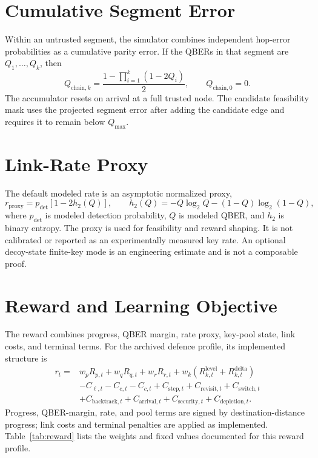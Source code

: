 \documentclass[12pt,a4paper,oneside]{report}
\begin{document}
\section{Cumulative Segment Error}
Within an untrusted segment, the simulator combines independent hop-error probabilities as a cumulative parity error. If the QBERs in that segment are $Q_1,\ldots,Q_k$, then
\begin{equation}
Q_{\mathrm{chain},k}
=\frac{1-\prod_{i=1}^{k}(1-2Q_i)}{2},
\qquad Q_{\mathrm{chain},0}=0.
\label{eq:chain}
\end{equation}
The accumulator resets on arrival at a full trusted node. The candidate feasibility mask uses the projected segment error after adding the candidate edge and requires it to remain below $Q_{\max}$.

\section{Link-Rate Proxy}
The default modeled rate is an asymptotic normalized proxy,
\begin{equation}
r_{\mathrm{proxy}}=p_{\mathrm{det}}\left[1-2h_2(Q)\right],
\qquad h_2(Q)=-Q\log_2Q-(1-Q)\log_2(1-Q),
\label{eq:proxy}
\end{equation}
where $p_{\mathrm{det}}$ is modeled detection probability, $Q$ is modeled QBER, and $h_2$ is binary entropy. The proxy is used for feasibility and reward shaping. It is not calibrated or reported as an experimentally measured key rate. An optional decoy-state finite-key mode is an engineering estimate and is not a composable proof.

\section{Reward and Learning Objective}
The reward combines progress, QBER margin, rate proxy, key-pool state, link costs, and terminal terms. For the archived defence profile, its implemented structure is
\begin{align}
r_t={}&w_pR_{p,t}+w_qR_{q,t}+w_rR_{r,t}
+w_k\left(R_{k,t}^{\mathrm{level}}+R_{k,t}^{\mathrm{delta}}\right) \nonumber\\
&-C_{\ell,t}-C_{e,t}-C_{c,t}
+C_{\mathrm{step},t}+C_{\mathrm{revisit},t}+C_{\mathrm{switch},t}\nonumber\\
&+C_{\mathrm{backtrack},t}+C_{\mathrm{arrival},t}
+C_{\mathrm{security},t}+C_{\mathrm{depletion},t}.
\label{eq:reward}
\end{align}
Progress, QBER-margin, rate, and pool terms are signed by destination-distance progress; link costs and terminal penalties are applied as implemented. Table~\ref{tab:reward} lists the weights and fixed values documented for this reward profile.
\end{document}

